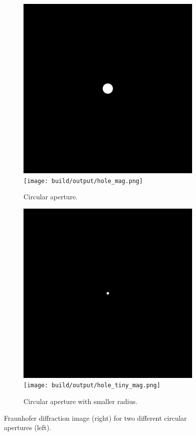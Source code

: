 \begin{figure}[htbp]
    \centering
    \begin{subfigure}[h]{\linewidth}
        \centering
        \includegraphics[width=.49\linewidth]{images/hole.png}
        \texttt{[image: build/output/hole\_mag.png]}
        \caption{Circular aperture.}
    \end{subfigure}
    \begin{subfigure}[h]{\linewidth}
        \centering
        \includegraphics[width=.49\linewidth]{images/hole_tiny.png}
        \texttt{[image: build/output/hole\_tiny\_mag.png]}
        \caption{Circular aperture with smaller radius.}
    \end{subfigure}
    \caption{Fraunhofer diffraction image (right) for two different circular apertures (left).}
    \label{fig:circular}
\end{figure}


